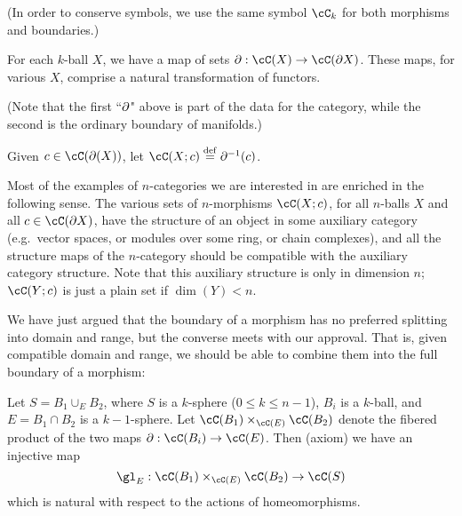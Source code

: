(In order to conserve symbols, we use the same symbol $\cC_k$ for both morphisms and boundaries.)

{For each $k$-ball $X$, we have a map of sets $\bd: \cC(X)\to \cC(\bd X)$.
These maps, for various $X$, comprise a natural transformation of functors.}

(Note that the first ``$\partial$" above is part of the data for the category, 
while the second is the ordinary boundary of manifolds.)

Given $c\in\cC(\bd(X))$, let $\cC(X; c) \deq \bd^{-1}(c)$.

Most of the examples of $n$-categories we are interested in are enriched in the following sense.
The various sets of $n$-morphisms $\cC(X; c)$, for all $n$-balls $X$ and
all $c\in \cC(\bd X)$, have the structure of an object in some auxiliary category
(e.g.\ vector spaces, or modules over some ring, or chain complexes),
and all the structure maps of the $n$-category should be compatible with the auxiliary
category structure.
Note that this auxiliary structure is only in dimension $n$;
$\cC(Y; c)$ is just a plain set if $\dim(Y) < n$.

\medskip
{}
\medskip

We have just argued that the boundary of a morphism has no preferred splitting into
domain and range, but the converse meets with our approval.
That is, given compatible domain and range, we should be able to combine them into
the full boundary of a morphism:

{Let $S = B_1 \cup_E B_2$, where $S$ is a $k$-sphere ($0\le k\le n-1$),
$B_i$ is a $k$-ball, and $E = B_1\cap B_2$ is a $k{-}1$-sphere.
Let $\cC(B_1) \times_{\cC(E)} \cC(B_2)$ denote the fibered product of the 
two maps $\bd: \cC(B_i)\to \cC(E)$.
Then (axiom) we have an injective map
\[
	\gl_E : \cC(B_1) \times_{\cC(E)} \cC(B_2) \to \cC(S)
\]
which is natural with respect to the actions of homeomorphisms.}

